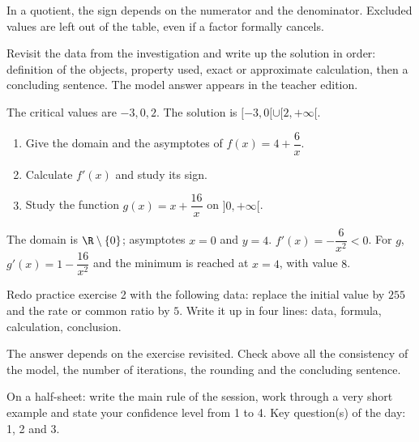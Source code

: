 \begin{summary}In a quotient, the sign depends on the numerator and the denominator. Excluded values are left out of the table, even if a factor formally cancels.\end{summary}

\begin{example}
Revisit the data from the investigation and write up the solution in order: definition of the objects, property used, exact or approximate calculation, then a concluding sentence. The model answer appears in the teacher edition.
\end{example}
\begin{solution}The critical values are $-3,0,2$. The solution is $[-3,0[\cup[2,+\infty[$.\end{solution}

\begin{exercise}[essential]
\begin{enumerate}\item Give the domain and the asymptotes of $f(x)=4+\dfrac{6}x$.\item Calculate $f'(x)$ and study its sign.\item Study the function $g(x)=x+\dfrac{16}x$ on $]0,+\infty[$.\end{enumerate}
\end{exercise}
\begin{solution}The domain is $\R\setminus\{0\}$; asymptotes $x=0$ and $y=4$. $f'(x)=-\dfrac{6}{x^2}<0$. For $g$, $g'(x)=1-\dfrac{16}{x^2}$ and the minimum is reached at $x=4$, with value $8$.\end{solution}


\begin{homework}Redo practice exercise 2 with the following data: replace the initial value by $255$ and the rate or common ratio by $5$. Write it up in four lines: data, formula, calculation, conclusion.\end{homework}
\begin{solution}The answer depends on the exercise revisited. Check above all the consistency of the model, the number of iterations, the rounding and the concluding sentence.\end{solution}

\begin{exitticket}[3 minutes]On a half-sheet: write the main rule of the session, work through a very short example and state your confidence level from 1 to 4. Key question(s) of the day: 1, 2 and 3.\end{exitticket}


